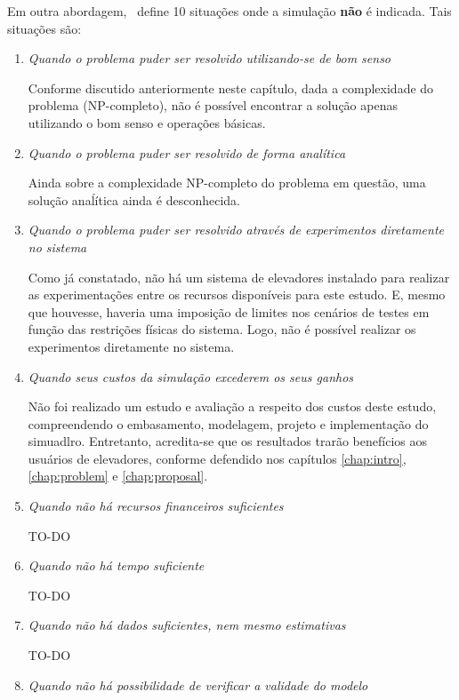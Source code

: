 Em outra abordagem,~\cite{BanksGibson} define 10 situações onde a simulação
\textbf{não} é indicada. Tais situações são:

\begin{enumerate}
\item \textit{Quando o problema puder ser resolvido utilizando-se de bom senso}

Conforme discutido anteriormente neste capítulo, dada a complexidade do problema
(NP-completo), não é possível encontrar a solução apenas utilizando o bom senso
e operações básicas.

\item \textit{Quando o problema puder ser resolvido de forma analítica}

Ainda sobre a complexidade NP-completo do problema em questão, uma solução
anaĺítica ainda é desconhecida.

\item \textit{Quando o problema puder ser resolvido através de experimentos
diretamente no sistema}

Como já constatado, não há um sistema de elevadores instalado para realizar as
experimentações entre os recursos disponíveis para este estudo. E, mesmo que
houvesse, haveria uma imposição de limites nos cenários de testes em função das
restrições físicas do sistema. Logo, não é possível realizar os experimentos
diretamente no sistema.

\item \textit{Quando seus custos da simulação excederem os seus ganhos}

Não foi realizado um estudo e avaliação a respeito dos custos deste estudo,
compreendendo o embasamento, modelagem, projeto e implementação do simuadlro.
Entretanto, acredita-se que os resultados trarão benefícios aos usuários de
elevadores, conforme defendido nos capítulos \ref{chap:intro},
\ref{chap:problem} e \ref{chap:proposal}.

\item \textit{Quando não há recursos financeiros suficientes}

TO-DO %

\item \textit{Quando não há tempo suficiente}

TO-DO %

\item \textit{Quando não há dados suficientes, nem mesmo estimativas}

TO-DO %

\item \textit{Quando não há possibilidade de verificar a validade do modelo}


\end{enumerate}
